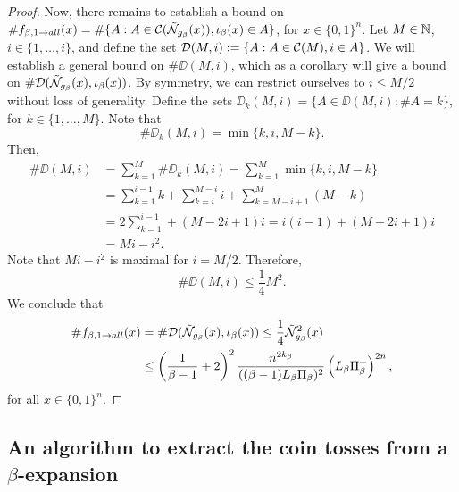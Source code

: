\begin{proof}
    \noindent Now, there remains to establish a bound on $\#f_{\beta, 1 \to all}(x) = \#\{ A : A \in \mathcal{C}(\tilde {\mathcal{N}}_{g_\beta}(x)), \iota_\beta(x) \in A\}$, for $x \in \{0,1\}^n$. Let $M \in \mathbb{N}$, $i \in \{1,\ldots, i\}$, and define the set $\mathcal{D}(M,i) := \{ A : A \in \mathcal{C}(M), i \in A\}$. We will establish a general bound on $\#\DD(M,i)$, which as a corollary will give a bound on $\#\mathcal{D}(\tilde {\mathcal{N}}_{g_\beta}(x),\iota_\beta(x))$. By symmetry, we can restrict ourselves to $i \leq M/2$ without loss of generality. Define the sets $\DD_k(M,i) = \{ A \in \DD(M,i) : \#A = k\}$, for $k \in \{1, \ldots, M\}$. Note that 
    \begin{equation}
        \#\DD_k(M,i) = \min\{k, i, M-k\}.
    \end{equation}
    Then,
    \begin{align}
        \# \DD(M,i) &= \sum_{k = 1}^M \#\DD_k(M,i) = \sum_{k = 1}^M \min\{k, i, M-k\}\\
        &= \sum_{k=1}^{i-1} k + \sum_{k=i}^{M-i} i + \sum_{k=M - i +1}^{M} (M -k)\\
        & = 2 \sum_{k=1}^{i-1} + (M - 2i + 1)i = i(i-1) + (M - 2i + 1)i\\
        &= Mi - i^2.
    \end{align}
    Note that $Mi - i^2$ is maximal for $i = M/2$. Therefore,
    \begin{equation}
        \# \DD(M,i) \leq \frac14 M^2.
    \end{equation}
    We conclude that 
    \begin{align}
        \#f_{\beta, 1 \to all}(x) &= \#\mathcal{D}(\tilde {\mathcal{N}}_{g_\beta}(x),\iota_\beta(x)) \leq \frac14 \tilde {\mathcal{N}}^2_{g_\beta}(x)\\
        & \leq \left(\frac{1}{\beta-1} + 2\right)^2\frac{n^{2k_\beta}}{((\beta-1)L_\beta\Pi_\beta)^2}\left(L_\beta \Pi_\beta^+ \right)^{2n},
    \end{align}
    for all $x \in \{0,1\}^n$.
\end{proof}

\subsection{\texorpdfstring{An algorithm to extract the coin tosses from a $\beta$-expansion}{}}

